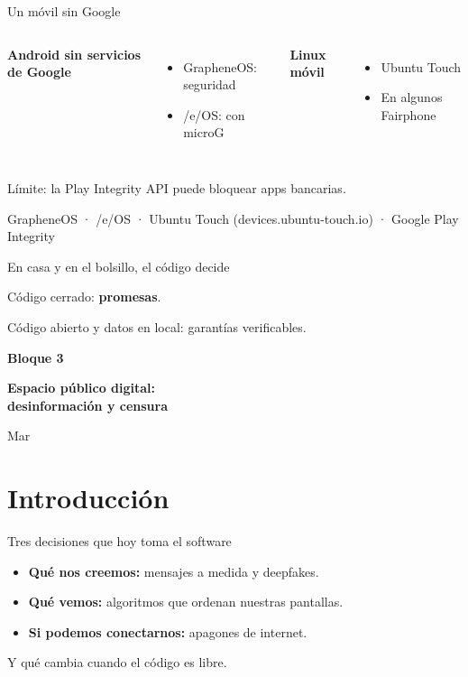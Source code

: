 \documentclass[aspectratio=169,12pt]{beamer}
\def\navprev{}
\def\navnext{}
\newcommand{\nav}[2]{\gdef\navprev{#1}\gdef\navnext{#2}}
\newcommand{\bloque}[3]{%
  \begin{frame}[plain]
    \vfill
    \begin{center}
      {\color{terra}\large\bfseries Bloque #1}\\[0.3cm]
      {\color{azul}\LARGE\bfseries #2\par}\vspace{0.5cm}
      {\large #3}
    \end{center}
    \vfill
  \end{frame}}
\newcommand{\fuente}[1]{\vfill{\small\color{gris}#1\par}}
\begin{document}
\nav{F-Droid}{Cierre}
\begin{frame}{Un móvil sin Google}
  \begin{columns}[T]
      \begin{center}{\large\bfseries\color{azul}Android sin servicios de Google}\end{center}
      \begin{itemize}
        \item GrapheneOS: seguridad
        \item /e/OS: con microG
      \end{itemize}
      \begin{center}{\large\bfseries\color{terra}Linux móvil}\end{center}
      \begin{itemize}
        \item Ubuntu Touch
        \item En algunos Fairphone
      \end{itemize}
  \end{columns}
  \vspace{0.3cm}
  {\large\alert{Límite: la Play Integrity API puede bloquear apps bancarias.}}
  \fuente{GrapheneOS · /e/OS · Ubuntu Touch (devices.ubuntu-touch.io) · Google Play Integrity}
\end{frame}

\nav{Móvil sin Google}{}
\begin{frame}{En casa y en el bolsillo, el código decide}
  \vspace{0.3cm}
  {\Large Código cerrado: \alert{\textbf{promesas}}.\par}
  \vspace{0.8cm}
  {\Large Código abierto y datos en local: garantías verificables.\par}
\end{frame}
\nav{}{}
\bloque{3}{Espacio público digital:\\desinformación y censura}{Mar}

\section{Introducción}
\nav{}{Software libre}
\begin{frame}{Tres decisiones que hoy toma el software}
  \begin{itemize}
    \item \textbf{Qué nos creemos:} mensajes a medida y deepfakes.
    \item \textbf{Qué vemos:} algoritmos que ordenan nuestras pantallas.
    \item \textbf{Si podemos conectarnos:} apagones de internet.
  \end{itemize}
  \vspace{0.5cm}
  {\large\alert{Y qué cambia cuando el código es libre.}}
\end{frame}
\end{document}
